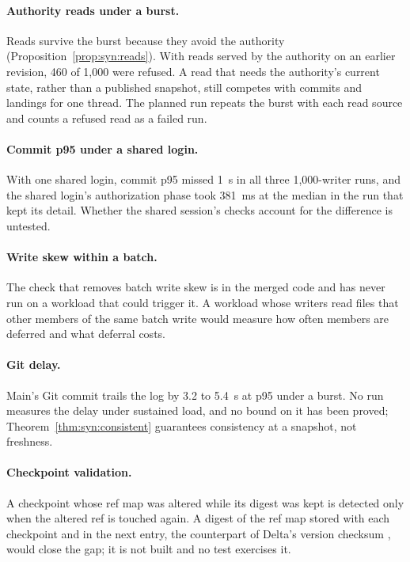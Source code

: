 \documentclass[11pt,letterpaper]{article}
\theoremstyle{definition}
\theoremstyle{remark}
\begin{document}
\paragraph{Authority reads under a burst.} Reads survive the burst because they avoid the authority (Proposition~\ref{prop:syn:reads}). With reads served by the authority on an earlier revision, 460 of 1,000 were refused. %
A read that needs the authority's current state, rather than a published snapshot, still competes with commits and landings for one thread. The planned run repeats the burst with each read source and counts a refused read as a failed run.

\paragraph{Commit p95 under a shared login.} With one shared login, commit p95 missed 1~s in all three 1,000-writer runs, and the shared login's authorization phase took 381~ms at the median in the run that kept its detail. %
Whether the shared session's checks account for the difference is untested.

\paragraph{Write skew within a batch.} The check that removes batch write skew is in the merged code and has never run on a workload that could trigger it. A workload whose writers read files that other members of the same batch write would measure how often members are deferred and what deferral costs.

\paragraph{Git delay.} Main's Git commit trails the log by 3.2 to 5.4~s at p95 under a burst. %
No run measures the delay under sustained load, and no bound on it has been proved; Theorem~\ref{thm:syn:consistent} guarantees consistency at a snapshot, not freshness.

\paragraph{Checkpoint validation.} A checkpoint whose ref map was altered while its digest was kept is detected only when the altered ref is touched again. A digest of the ref map stored with each checkpoint and in the next entry, the counterpart of Delta's version checksum \cite{deltaprotocol}, would close the gap; it is not built and no test exercises it.
\end{document}
